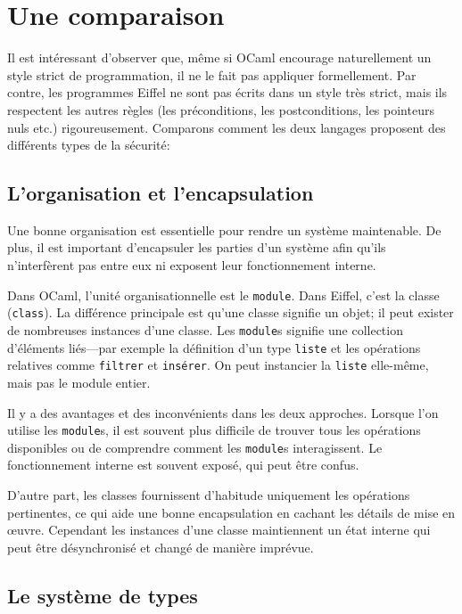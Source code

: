 \documentclass[french]{report}
\begin{document}
\chapter{Une comparaison}

Il est intéressant d'observer que, même si OCaml encourage naturellement un style strict de programmation, il ne le fait pas appliquer formellement. Par contre, les programmes Eiffel ne sont pas écrits dans un style très strict, mais ils respectent les autres règles (les préconditions, les postconditions, les pointeurs nuls etc.) rigoureusement. Comparons comment les deux langages proposent des différents types de la sécurité:

\section{L'organisation et l'encapsulation}

Une bonne organisation est essentielle pour rendre un système maintenable. De plus, il est important d'encapsuler les parties d'un système afin qu'ils n'interfèrent pas entre eux ni exposent leur fonctionnement interne.

Dans OCaml, l'unité organisationnelle est le \texttt{module}. Dans Eiffel, c'est la classe (\texttt{class}). La différence principale est qu'une classe signifie un objet; il peut exister de nombreuses instances d'une classe. Les \texttt{module}s signifie une collection d'éléments liés---par exemple la définition d'un type \texttt{liste} et les opérations relatives comme \texttt{filtrer} et \texttt{insérer}. On peut instancier la \texttt{liste} elle-même, mais pas le module entier.

Il y a des avantages et des inconvénients dans les deux approches. Lorsque l'on utilise les \texttt{module}s, il est souvent plus difficile de trouver tous les opérations disponibles ou de comprendre comment les \texttt{module}s interagissent. Le fonctionnement interne est souvent exposé, qui peut être confus.

D'autre part, les classes fournissent d'habitude uniquement les opérations pertinentes, ce qui aide une bonne encapsulation en cachant les détails de mise en œuvre. Cependant les instances d'une classe maintiennent un état interne qui peut être désynchronisé et changé de manière imprévue.

\section{Le système de types}
\end{document}
